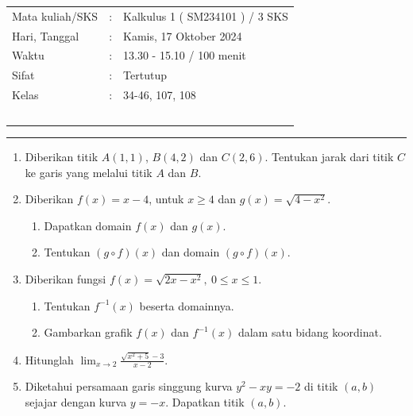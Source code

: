 \documentclass[10pt,openany,a4paper]{article}
\theoremstyle{definition}
\theoremstyle{definition}
\theoremstyle{plain}
\begin{document}
    \begin{center}
	\begin{tabular}{lcl}
		Mata kuliah/SKS & : & Kalkulus 1 ( SM234101 ) / 3 SKS\\
		Hari, Tanggal & : & Kamis, 17 Oktober 2024\\
		Waktu & : & 13.30 - 15.10 / 100 menit\\
		Sifat & : & Tertutup\\
		Kelas & : & 34-46, 107, 108\\
  ~
	\end{tabular}

    \noindent\rule{\textwidth}{2.pt}
        \end{center}
    \begin{enumerate}
    \item Diberikan titik $A(1,1)$, $B(4,2)$ dan $C(2,6)$. Tentukan jarak dari titik $C$ ke garis yang melalui titik $A$ dan $B$.

    \item Diberikan $f(x)=x-4$, untuk $x\geq 4$ dan $g(x)=\sqrt{4-x^2}$.
    \begin{enumerate}
        \item Dapatkan domain $f(x)$ dan $g(x)$.
        \item Tentukan $(g\circ f)(x)$ dan domain $(g\circ f)(x)$.
    \end{enumerate}

    \item Diberikan fungsi $f(x)=\sqrt{2x-x^2},\ 0\leq x\leq 1$.
    \begin{enumerate}
        \item Tentukan $f^{-1}(x)$ beserta domainnya.
        \item Gambarkan grafik $f(x)$ dan $f^{-1}(x)$ dalam satu bidang koordinat.
    \end{enumerate}

    \item Hitunglah $\displaystyle\lim_{x\to 2}\frac{\sqrt{x^2+5}-3}{x-2}$.

    \item Diketahui persamaan garis singgung kurva $y^2-xy=-2$ di titik $(a,b)$ sejajar dengan kurva $y=-x$. Dapatkan titik $(a,b)$.
\end{enumerate}

\newpage 


\end{document}
